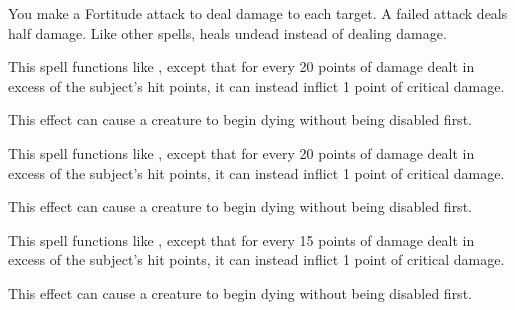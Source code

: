 \begin{spelleffect}
    You make a Fortitude attack to deal damage to each target. A failed attack deals half damage. Like other  spells,  heals undead instead of dealing damage.
\end{spelleffect}

\begin{spelleffect}
    This spell functions like , except that for every 20 points of damage dealt in excess of the subject's hit points, it can instead inflict 1 point of critical damage.
\end{spelleffect}
\begin{spellnotes}
    This effect can cause a creature to begin dying without being disabled first.
\end{spellnotes}

\begin{spelleffect}
    This spell functions like , except that for every 20 points of damage dealt in excess of the subject's hit points, it can instead inflict 1 point of critical damage.
\end{spelleffect}
\begin{spellnotes}
    This effect can cause a creature to begin dying without being disabled first.
\end{spellnotes}

\begin{spelleffect}
    This spell functions like , except that for every 15 points of damage dealt in excess of the subject's hit points, it can instead inflict 1 point of critical damage.
\end{spelleffect}
\begin{spellnotes}
    This effect can cause a creature to begin dying without being disabled first.
\end{spellnotes}

